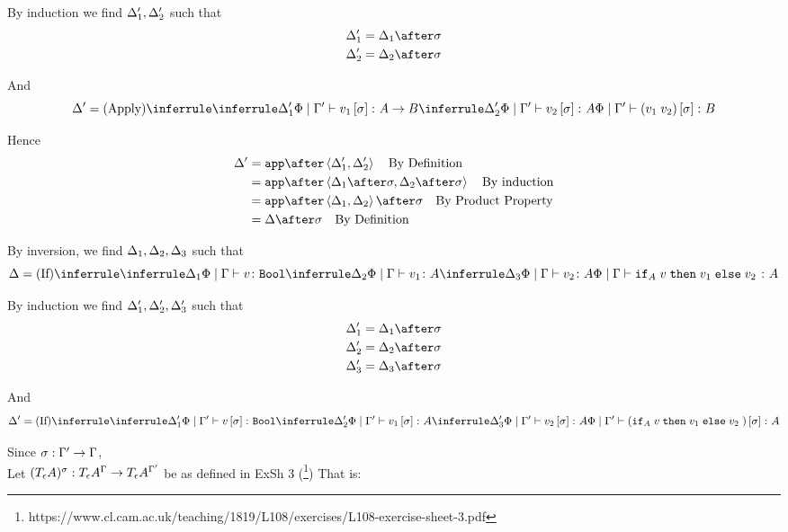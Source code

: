 {By induction we find $\Delta_1', \Delta_2'$ such that 
\begin{align}
    \D_1' &= \D_1\after\si\\
    \D_2' &= \D_2\after\si\\
\end{align}

And
\begin{equation}
    \D' = \ntreeruleII{Apply}{\treeruleI{\D_1'}{\etyperelation{\P}{\G'}{v_1\ssi}{\ab}}}{\treeruleI{\D_2'}{\etyperelation{\P}{\G'}{v_2\ssi}{A}}}{\etyperelation{\P}{\G'}{(\apply{v_1}{v_2})\ssi}{B}}
\end{equation}

Hence
\begin{align}
    \D' &= \app\after\pr{\D_1'}{\D_2'}\qt{By Definition}\\
        &= \app\after\pr{\D_1\after\si}{\D_2\after\si}\qt{By induction}\\
        &= \app\after\pr{\D_1}{\D_2}\after\si\qt{By Product Property}\\
        & = \D\after\si\qt{By Definition}\\
\end{align}



By inversion, we find $\Delta_1, \Delta_2, \Delta_3$ such that
\begin{equation}
    \D = \ntreeruleIII{If}{\treeruleI{\D_1}{\etyperelation{\P}{\G}{v}{\B}}}{\treeruleI{\D_2}{\etyperelation{\P}{\G}{v_1}{A}}}{\treeruleI{\D_3}{\etyperelation{\P}{\G}{v_2}{A}}}{\etyperelation{\P}{\G}{\pifthenelse{A}{v}{v_1}{v_2}}{A}}
\end{equation}

By induction we find $\Delta_1', \Delta_2', \Delta_3'$ such that 
\begin{align}
    \D_1' &= \D_1\after\si\\
    \D_2' &= \D_2\after\si\\
    \D_3' &= \D_3\after\si\\
\end{align}

And
\begin{equation}
    \D' = \ntreeruleIII{If}{\treeruleI{\D_1'}{\etyperelation{\P}{\G'}{v\ssi}{\B}}}{\treeruleI{\D_2'}{\etyperelation{\P}{\G'}{v_1\ssi}{A}}}{\treeruleI{\D_3'}{\etyperelation{\P}{\G'}{v_2\ssi}{A}}}{\etyperelation{\P}{\G'}{(\pifthenelse{A}{v}{v_1}{v_2})\ssi}{A}}
\end{equation}

Since $\sigma: \Gamma' \rightarrow \Gamma$, \\
Let $(T_{\epsilon}{A})^{\sigma}: T_{\epsilon}{A}^{\Gamma}\rightarrow T_{\epsilon}{A}^{\Gamma'}$ be as defined in ExSh 3 (\footnote{https://www.cl.cam.ac.uk/teaching/1819/L108/exercises/L108-exercise-sheet-3.pdf})
That is:

}
